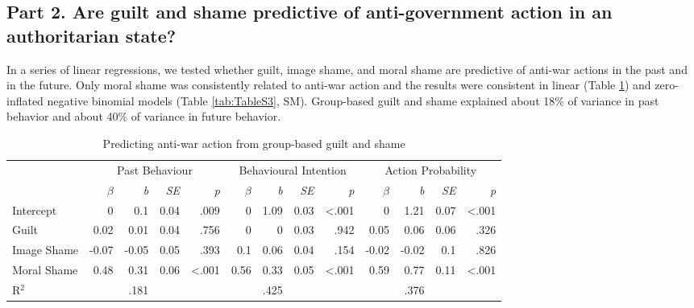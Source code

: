 \documentclass[
]{article}
\begin{document}
\hypertarget{part-2.-are-guilt-and-shame-predictive-of-anti-government-action-in-an-authoritarian-state}{%
\subsection*{Part 2. Are guilt and shame predictive of anti-government action in an authoritarian state?}\label{part-2.-are-guilt-and-shame-predictive-of-anti-government-action-in-an-authoritarian-state}}

In a series of linear regressions, we tested whether guilt, image shame, and moral shame are predictive of anti-war actions in the past and in the future. Only moral shame was consistently related to anti-war action and the results were consistent in linear (Table \ref{tab:Table2}) and zero-inflated negative binomial models (Table \ref{tab:TableS3}, SM). Group-based guilt and shame explained about 18\% of variance in past behavior and about 40\% of variance in future behavior.

\begin{table}[H]

\caption{\label{tab:Table2}Predicting anti-war action from group-based guilt and shame}
\centering
\fontsize{8}{10}\selectfont
\begin{tabular}[t]{lrrrrrrrrrrrr}
\toprule
\multicolumn{1}{c}{} & \multicolumn{4}{c}{Past Behaviour} & \multicolumn{4}{c}{Behavioural Intention} & \multicolumn{4}{c}{Action Probability} \\
\cmidrule(l{3pt}r{3pt}){2-5} \cmidrule(l{3pt}r{3pt}){6-9} \cmidrule(l{3pt}r{3pt}){10-13}
\em{ } & \em{$\beta$} & \em{b} & \em{SE} & \em{p} & \em{$\beta$} & \em{b} & \em{SE} & \em{p} & \em{$\beta$} & \em{b} & \em{SE} & \em{p}\\
\midrule
Intercept & 0 & 0.1 & 0.04 & .009 & 0 & 1.09 & 0.03 & <.001 & 0 & 1.21 & 0.07 & <.001\\
Guilt & 0.02 & 0.01 & 0.04 & .756 & 0 & 0 & 0.03 & .942 & 0.05 & 0.06 & 0.06 & .326\\
Image Shame & -0.07 & -0.05 & 0.05 & .393 & 0.1 & 0.06 & 0.04 & .154 & -0.02 & -0.02 & 0.1 & .826\\
Moral Shame & 0.48 & 0.31 & 0.06 & <.001 & 0.56 & 0.33 & 0.05 & <.001 & 0.59 & 0.77 & 0.11 & <.001\\
\midrule
R$^{2}$ &  & .181 &  &  &  & .425 &  &  &  & .376 &  & \\
\bottomrule
\end{tabular}
\end{table}
\end{document}
